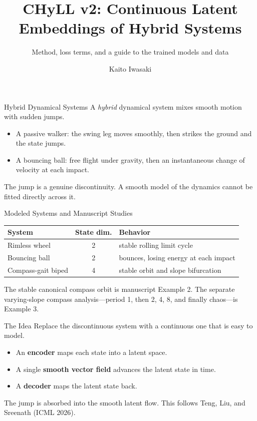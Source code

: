 \documentclass[10pt,aspectratio=169]{beamer}
\title[CHyLL v2]{CHyLL v2: Continuous Latent Embeddings of Hybrid Systems}
\subtitle{Method, loss terms, and a guide to the trained models and data}
\author{Kaito Iwasaki}
\date{}
\begin{document}
\begin{frame}
  \titlepage
\end{frame}

\begin{frame}{Hybrid Dynamical Systems}
  A \emph{hybrid} dynamical system mixes smooth motion with sudden jumps.

  \vspace{0.8em}
  \begin{itemize}
    \item A passive walker: the swing leg moves smoothly, then strikes the
      ground and the state jumps.
    \item A bouncing ball: free flight under gravity, then an instantaneous
      change of velocity at each impact.
  \end{itemize}

  \vspace{0.8em}
  The jump is a genuine discontinuity. A smooth model of the dynamics cannot
  be fitted directly across it.
\end{frame}

\begin{frame}{Modeled Systems and Manuscript Studies}
  \begin{center}
  \begin{tabular}{lcl}
    \toprule
    System & State dim. & Behavior \\
    \midrule
    Rimless wheel & 2 & stable rolling limit cycle \\
    Bouncing ball & 2 & bounces, losing energy at each impact \\
    Compass-gait biped & 4 & stable orbit and slope bifurcation \\
    \bottomrule
  \end{tabular}
  \end{center}

  \vspace{1em}
  The stable canonical compass orbit is manuscript Example 2.  The separate
  varying-slope compass analysis---period 1, then 2, 4, 8, and finally
  chaos---is Example 3.
\end{frame}

\begin{frame}{The Idea}
  Replace the discontinuous system with a continuous one that is easy to model.

  \vspace{0.8em}
  \begin{itemize}
    \item An \textbf{encoder} maps each state into a latent space.
    \item A single \textbf{smooth vector field} advances the latent state in
      time.
    \item A \textbf{decoder} maps the latent state back.
  \end{itemize}

  \vspace{0.8em}
  The jump is absorbed into the smooth latent flow. This follows Teng, Liu,
  and Sreenath (ICML 2026).
\end{frame}
\end{document}

